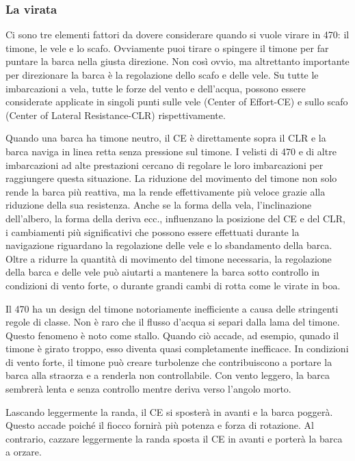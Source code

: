 \subsubsection{La virata}
\label{subsubsec:LaVirata}
Ci sono tre elementi fattori da dovere considerare quando si vuole virare in 470: il
timone, le vele e lo scafo. Ovviamente puoi tirare o spingere il timone per far
puntare la barca nella giusta direzione. Non così ovvio, ma altrettanto
importante per direzionare la barca è la regolazione dello scafo e delle vele. Su
tutte le imbarcazioni a vela, tutte le forze del vento e dell'acqua, possono
essere considerate applicate in singoli punti sulle vele (Center of Effort-CE) e sullo scafo
(Center of Lateral Resistance-CLR) rispettivamente.

Quando una barca ha timone neutro, il CE è direttamente sopra il CLR e la barca naviga in linea
retta senza pressione sul timone. I velisti di 470 e di altre imbarcazioni ad
alte prestazioni cercano di regolare le loro imbarcazioni per raggiungere questa
situazione. La riduzione del movimento del timone non solo rende la barca più
reattiva, ma la rende effettivamente più veloce grazie alla riduzione della sua
resistenza. Anche se la forma della vela, l'inclinazione dell'albero,
la forma della deriva ecc., influenzano la posizione del CE e del CLR, i
cambiamenti più significativi che possono essere effettuati durante la navigazione riguardano la
regolazione delle vele e lo sbandamento della barca. Oltre a ridurre la quantità
di movimento del timone necessaria, la regolazione della barca e delle vele può
aiutarti a mantenere la barca sotto controllo in condizioni di vento forte, o
durante grandi cambi di rotta come le virate in boa.

Il 470 ha un design del timone notoriamente inefficiente a causa delle
stringenti regole di classe. Non è raro che il flusso d'acqua si separi dalla
lama del timone. Questo fenomeno è noto come stallo. Quando ciò accade, ad
esempio, qunado il timone è girato troppo, esso diventa quasi completamente
inefficace.
In condizioni di vento forte, il timone può creare turbolenze che contribuiscono
a portare la barca alla straorza e a renderla non controllabile. Con vento
leggero, la barca sembrerà lenta e senza controllo mentre deriva verso l'angolo
morto.

Lascando leggermente la randa, il
CE si sposterà in avanti e la barca poggerà. Questo accade poiché il fiocco
fornirà più potenza e forza di rotazione. Al contrario, cazzare leggermente la
randa sposta il CE in avanti e porterà la barca a orzare.

